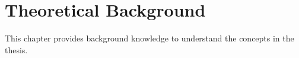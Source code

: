 \chapter{Theoretical Background}
\label{Chapter::Theoretical_Background} %
This chapter provides background knowledge to understand the concepts in the thesis.

